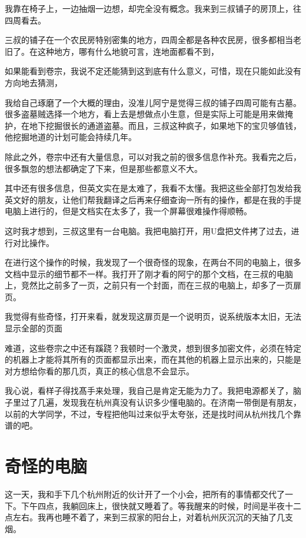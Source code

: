 我靠在椅子上，一边抽烟一边想，却完全没有概念。我来到三叔铺子的房顶上，往四周看去。

三叔的铺子在一个农民房特别密集的地方，四周全都是各种农民房，很多都相当老旧了。在这种地方，哪有什么地貌可言，连地面都看不到，

如果能看到卷宗，我说不定还能猜到这到底有什么意义，可惜，现在只能如此没有方向地去猜测，

我给自己琢磨了一个大概的理由，没准儿阿宁是觉得三叔的铺子四周可能有古墓。很多盗墓贼选择一个地方，看上去是想做点小生意，但是实际上可能是用来做掩护，在地下挖掘很长的通道盗墓。而且，三叔这种疯子，如果地下的宝贝够值钱，他挖掘地道的计划可能会持续几年。

除此之外，卷宗中还有大量信息，可以对我之前的很多信息作补充。我看完之后，很多飘忽的想法都确定了下来，但是那些都意义不大。

其中还有很多信息，但英文实在是太难了，我看不太懂。我把这些全部打包发给我英文好的朋友，让他们帮我翻译之后再来仔细查询一所有的操作，都是在我的手提电脑上进行的，但是文档实在太多了，我一个屏幕很难操作得顺畅。

这时我才想到，三叔这里有一台电脑。我把电脑打开，用U盘把文件拷了过去，进行对比操作。

在进行这个操作的时候，我发现了一个很奇怪的现象，在两台不同的电脑上，很多文档中显示的细节都不一样。我打开了刚才看的阿宁的那个文档，在三叔的电脑上，竞然比之前多了一页，之前只有一个封面，而在三叔的电脑上，却多了一页扉页。

我觉得有些奇怪，打开来看，就发现这扉页是一个说明页，说系统版本太旧，无法显示全部的页面

难道，这些卷宗之中还有蹊跷？我顿时一个激灵，想到很多加密文件，必须在特定的机器上才能将其所有的页面都显示出来，而在其他的机器上显示出来的，只能是对方想给你看的那几页，真正的核心信息不会显示。

我心说，看样子得找髙手来处理，我自己是肯定无能为力了。我把电源都关了，脑子里过了几遍，发现我在杭州真没有认识多少懂电脑的。在济南一带倒是有朋友，以前的大学同学，不过，专程把他叫过来似乎太夸张，还是找时间从杭州找几个靠谱的吧。

\chapter{奇怪的电脑}

这一天，我和手下几个杭州附近的伙计开了一个小会，把所有的事情都交代了一下。下午四点，我躺回床上，很快就又睡着了。等我醒来的时候，时间是半夜十二点左右。我再也睡不着了，来到三叔家的阳台上，对着杭州灰沉沉的天抽了几支烟。

